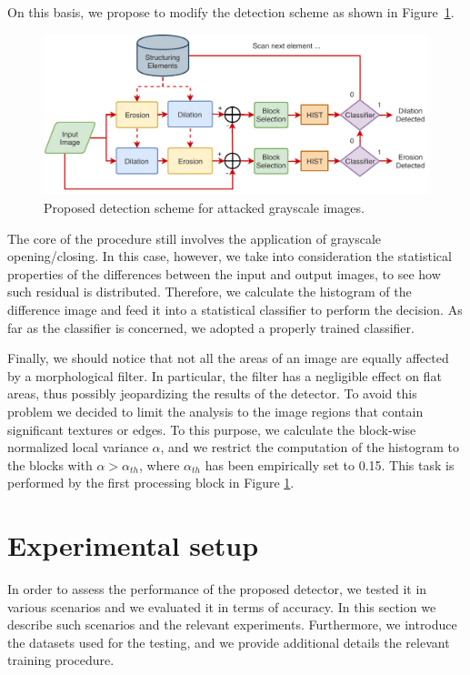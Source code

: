 \documentclass{ieeeaccess}
\begin{document}
On this basis, we propose to modify the detection scheme as shown in Figure~\ref{fig:scheme_improved}.
\begin{figure}[!ht]
	\centering
	\includegraphics[width=0.7\linewidth]{diagram2}
	\caption{Proposed detection scheme for attacked grayscale images.} 
	\label{fig:scheme_improved}
\end{figure}
The core of the procedure still involves the application of grayscale opening/closing. In this case, however, we take into consideration the statistical properties of the differences between the input and output images, to see how such residual is distributed. Therefore, we calculate the histogram of the difference image and feed it into a statistical classifier to perform the decision. As far as the classifier is concerned, we adopted a properly trained classifier. %

Finally, we should notice that not all the areas of an image are equally affected by a morphological filter. In particular, the filter has a negligible effect on flat areas, thus possibly jeopardizing the results of the detector. To avoid this problem we decided to limit the analysis to the image regions that contain significant textures or edges. To this purpose, we calculate the block-wise normalized local variance $\alpha$, and we restrict the computation of the histogram to the blocks with $\alpha > \alpha_{th}$, where $\alpha_{th}$ has been empirically set to 0.15. This task is performed by the first processing block in Figure \ref{fig:scheme_improved}. 


\section{Experimental setup}
\label{sec:exp_setup}

In order to assess the performance of the proposed detector, we tested it in various scenarios and we evaluated it in terms of accuracy. In this section we describe such scenarios and the relevant experiments. Furthermore, we introduce the datasets used for the testing, and we provide additional details the relevant training procedure.
\end{document}
